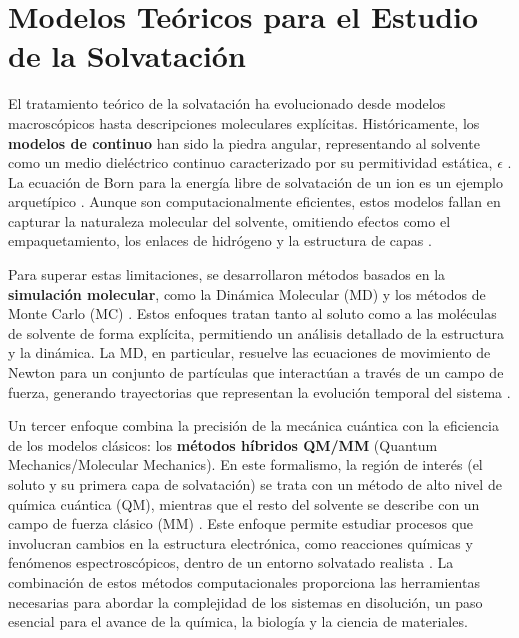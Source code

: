 \section{Modelos Teóricos para el Estudio de la Solvatación}

El tratamiento teórico de la solvatación ha evolucionado desde modelos macroscópicos hasta descripciones moleculares explícitas. Históricamente, los \textbf{modelos de continuo} han sido la piedra angular, representando al solvente como un medio dieléctrico continuo caracterizado por su permitividad estática, $\epsilon$ \cite[8]{hirata2003molecular}. La ecuación de Born para la energía libre de solvatación de un ion es un ejemplo arquetípico \cite[6]{nishiyama2021molecular}. Aunque son computacionalmente eficientes, estos modelos fallan en capturar la naturaleza molecular del solvente, omitiendo efectos como el empaquetamiento, los enlaces de hidrógeno y la estructura de capas \cite[5, 23]{canuto2010solvation}.

Para superar estas limitaciones, se desarrollaron métodos basados en la \textbf{simulación molecular}, como la Dinámica Molecular (MD) y los métodos de Monte Carlo (MC) \cite[9]{hirata2003molecular}. Estos enfoques tratan tanto al soluto como a las moléculas de solvente de forma explícita, permitiendo un análisis detallado de la estructura y la dinámica. La MD, en particular, resuelve las ecuaciones de movimiento de Newton para un conjunto de partículas que interactúan a través de un campo de fuerza, generando trayectorias que representan la evolución temporal del sistema \cite[22]{nishiyama2021molecular}.

Un tercer enfoque combina la precisión de la mecánica cuántica con la eficiencia de los modelos clásicos: los \textbf{métodos híbridos QM/MM} (Quantum Mechanics/Molecular Mechanics). En este formalismo, la región de interés (el soluto y su primera capa de solvatación) se trata con un método de alto nivel de química cuántica (QM), mientras que el resto del solvente se describe con un campo de fuerza clásico (MM) \cite[15]{canuto2010solvation}. Este enfoque permite estudiar procesos que involucran cambios en la estructura electrónica, como reacciones químicas y fenómenos espectroscópicos, dentro de un entorno solvatado realista \cite[10]{nishiyama2021molecular}. La combinación de estos métodos computacionales proporciona las herramientas necesarias para abordar la complejidad de los sistemas en disolución, un paso esencial para el avance de la química, la biología y la ciencia de materiales.

